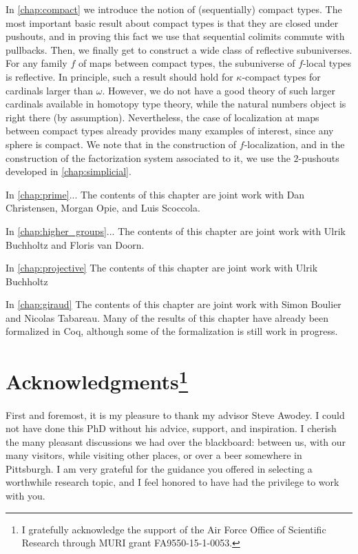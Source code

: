In \cref{chap:compact} we introduce the notion of (sequentially) compact types. The most important basic result about compact types is that they are closed under pushouts, and in proving this fact we use that sequential colimits commute with pullbacks.
Then, we finally get to construct a wide class of reflective subuniverses. For any family $f$ of maps between compact types, the subuniverse of $f$-local types is reflective. In principle, such a result should hold for $\kappa$-compact types for cardinals larger than $\omega$. However, we do not have a good theory of such larger cardinals available in homotopy type theory, while the natural numbers object is right there (by assumption). Nevertheless, the case of localization at maps between compact types already provides many examples of interest, since any sphere is compact. We note that in the construction of $f$-localization, and in the construction of the factorization system associated to it, we use the $2$-pushouts developed in \cref{chap:simplicial}.

In \cref{chap:prime}...
The contents of this chapter are joint work with Dan Christensen, Morgan Opie, and Luis Scoccola.

In \cref{chap:higher_groups}...
The contents of this chapter are joint work with Ulrik Buchholtz and Floris van Doorn.

In \cref{chap:projective}
The contents of this chapter are joint work with Ulrik Buchholtz

In \cref{chap:giraud}
The contents of this chapter are joint work with Simon Boulier and Nicolas Tabareau. Many of the results of this chapter have already been formalized in Coq, although some of the formalization is still work in progress.


\section{Acknowledgments\footnote{I gratefully acknowledge the support of the Air Force Office of Scientific Research through MURI grant FA9550-15-1-0053.}}
First and foremost, it is my pleasure to thank my advisor Steve Awodey. I could not have done this PhD without his advice, support, and inspiration. I cherish the many pleasant discussions we had over the blackboard: between us, with our many visitors, while visiting other places, or over a beer somewhere in Pittsburgh. I am very grateful for the guidance you offered in selecting a worthwhile research topic, and I feel honored to have had the privilege to work with you.

